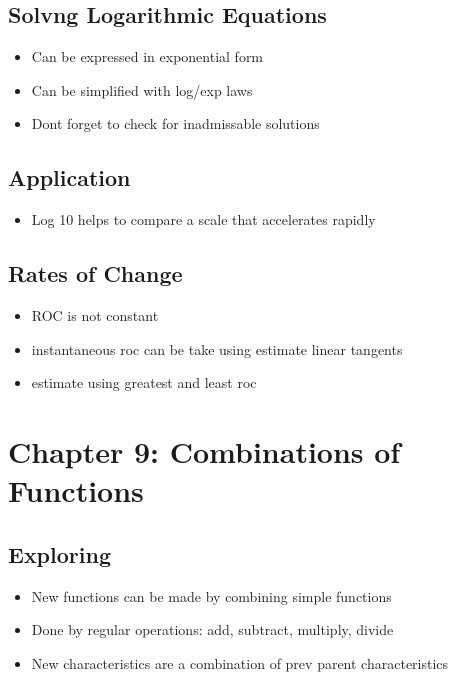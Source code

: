 \documentclass{article}
\begin{document}
    \subsection{Solvng Logarithmic Equations}
    \begin{itemize}
        \item Can be expressed in exponential form 
        \item Can be simplified with log/exp laws
        \item Dont forget to check for inadmissable solutions
    \end{itemize}

    \subsection{Application}
    \begin{itemize}
        \item Log 10 helps to compare a scale that accelerates rapidly
    \end{itemize}

    \subsection{Rates of Change}
    \begin{itemize}
        \item ROC is not constant
        \item instantaneous roc can be take using estimate linear tangents
        \item estimate using greatest and least roc
    \end{itemize}

    \section{Chapter 9: Combinations of Functions}

    \subsection{Exploring}
    \begin{itemize}
        \item New functions can be made by combining simple functions
        \item Done by regular operations: add, subtract, multiply, divide
        \item New characteristics are a combination of prev parent characteristics
    \end{itemize}
\end{document}
